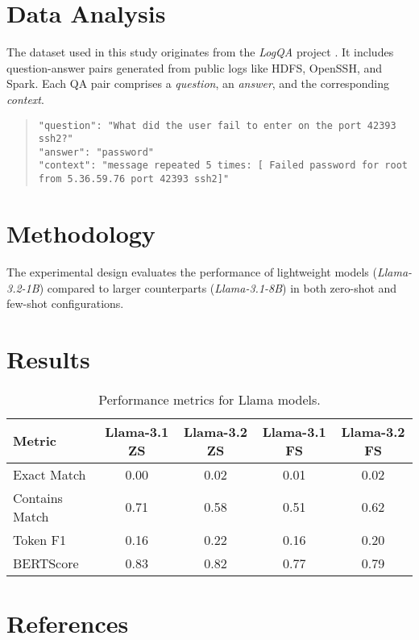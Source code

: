 \documentclass[11pt]{article}
\begin{document}
\section{Data Analysis}
The dataset used in this study originates from the \textit{LogQA} project \cite{huang2024}. It includes question-answer pairs generated from public logs like HDFS, OpenSSH, and Spark. Each QA pair comprises a \textit{question}, an \textit{answer}, and the corresponding \textit{context}.

\begin{quote}
\texttt{"question": "What did the user fail to enter on the port 42393 ssh2?"} \\
\texttt{"answer": "password"} \\
\texttt{"context": "message repeated 5 times: [ Failed password for root from 5.36.59.76 port 42393 ssh2]"}
\end{quote}

\section{Methodology}
The experimental design evaluates the performance of lightweight models (\textit{Llama-3.2-1B}) compared to larger counterparts (\textit{Llama-3.1-8B}) in both zero-shot and few-shot configurations.

\section{Results}
\begin{table}[h!]
\centering
\begin{tabular}{lcccc}
\toprule
Metric & Llama-3.1 ZS & Llama-3.2 ZS & Llama-3.1 FS & Llama-3.2 FS \\
\midrule
Exact Match & 0.00 & 0.02 & 0.01 & 0.02 \\
Contains Match & 0.71 & 0.58 & 0.51 & 0.62 \\
Token F1 & 0.16 & 0.22 & 0.16 & 0.20 \\
BERTScore & 0.83 & 0.82 & 0.77 & 0.79 \\
\bottomrule
\end{tabular}
\caption{Performance metrics for Llama models.}
\end{table}

\section{References}


\end{document}
